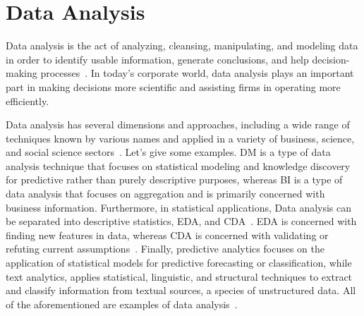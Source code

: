 \section{Data Analysis}\label{section:data_anal}
Data analysis is the act of analyzing, cleansing, manipulating, and modeling data in order to identify usable information, generate conclusions, and help decision-making processes~\cite{Book:sbrown_2014_transforming}.
In today's corporate world, data analysis plays an important part in making decisions more scientific and assisting firms in operating more efficiently. 

Data analysis has several dimensions and approaches, including a wide range of techniques known by various names and applied in a variety of business, science, and social science sectors~\cite{Book:pruneau_2017}.
Let's give some examples.
\ac{DM} is a type of data analysis technique that focuses on statistical modeling and knowledge discovery for predictive rather than purely descriptive purposes,
whereas \ac{BI} is a type of data analysis that focuses on aggregation and is primarily concerned with business information.
Furthermore, in statistical applications, Data analysis  can be separated into descriptive statistics, \ac{EDA}, and \ac{CDA}~\cite{Book:doing_data_science}. 
\ac{EDA} is concerned with finding new features in data, whereas \ac{CDA} is concerned with validating or refuting current assumptions~\cite{Article:intro_to_data_analysis}.
Finally, predictive analytics focuses on the application of statistical models for predictive forecasting or classification, 
while text analytics, applies statistical, linguistic, and structural techniques to extract and classify information from textual sources, a species of unstructured data.
All of the aforementioned are examples of data analysis~\cite{Article:goodnight_2011_the}.

